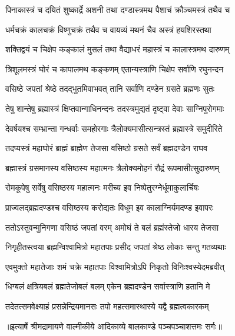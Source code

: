 \twolineshloka
{पिनाकास्त्रं च दयितं शुष्कार्द्रे अशनी तथा}
{दण्डास्त्रमथ पैशाचं क्रौञ्चमस्त्रं तथैव च} %

\twolineshloka
{धर्मचक्रं कालचक्रं विष्णुचक्रं तथैव च}
{वायव्यं मथनं चैव अस्त्रं हयशिरस्तथा} %

\twolineshloka
{शक्तिद्वयं च चिक्षेप कङ्कालं मुसलं तथा}
{वैद्याधरं महास्त्रं च कालास्त्रमथ दारुणम्} %

\twolineshloka
{त्रिशूलमस्त्रं घोरं च कापालमथ कङ्कणम्}
{एतान्यस्त्राणि चिक्षेप सर्वाणि रघुनन्दन} %

\twolineshloka
{वसिष्ठे जपतां श्रेष्ठे तदद्भुतमिवाभवत्}
{तानि सर्वाणि दण्डेन ग्रसते ब्रह्मणः सुतः} %

\twolineshloka
{तेषु शान्तेषु ब्रह्मास्त्रं क्षिप्तवान्गाधिनन्दनः}
{तदस्त्रमुद्यतं दृष्ट्वा देवाः साग्निपुरोगमाः} %

\twolineshloka
{देवर्षयश्च सम्भ्रान्ता गन्धर्वाः समहोरगाः}
{त्रैलोक्यमासीत्सन्त्रस्तं ब्रह्मास्त्रे समुदीरिते} %

\twolineshloka
{तदप्यस्त्रं महाघोरं ब्राह्मं ब्राह्मेण तेजसा}
{वसिष्ठो ग्रसते सर्वं ब्रह्मदण्डेन राघव} %

\twolineshloka
{ब्रह्मास्त्रं ग्रसमानस्य वसिष्ठस्य महात्मनः}
{त्रैलोक्यमोहनं रौद्रं रूपमासीत्सुदारुणम्} %

\twolineshloka
{रोमकूपेषु सर्वेषु वसिष्ठस्य महात्मनः}
{मरीच्य इव निष्पेतुरग्नेर्धूमाकुलार्चिषः} %

\twolineshloka
{प्राज्वलद्ब्रह्मदण्डश्च वसिष्ठस्य करोद्यतः}
{विधूम इव कालाग्निर्यमदण्ड इवापरः} %

\twolineshloka
{ततोऽस्तुवन्मुनिगणा वसिष्ठं जपतां वरम्}
{अमोघं ते बलं ब्रह्मंस्तेजो धारय तेजसा} %

\twolineshloka
{निगृहीतस्त्वया ब्रह्मन्विश्वामित्रो महातपाः}
{प्रसीद जपतां श्रेष्ठ लोकाः सन्तु गतव्यथाः} %

\twolineshloka
{एवमुक्तो महातेजाः शमं चक्रे महातपाः}
{विश्वामित्रोऽपि निकृतो विनिःश्वस्येदमब्रवीत्} %

\twolineshloka
{धिग्बलं क्षत्रियबलं ब्रह्मतेजोबलं बलम्}
{एकेन ब्रह्मदण्डेन सर्वास्त्राणि हतानि मे} %

\twolineshloka
{तदेतत्समवेक्ष्याहं प्रसन्नेन्द्रियमानसः}
{तपो महत्समास्थास्ये यद्वै ब्रह्मत्वकारकम्} %


{॥इत्यार्षे श्रीमद्रामायणे वाल्मीकीये आदिकाव्ये बालकाण्डे पञ्चपञ्चाशत्तमः सर्गः॥}

